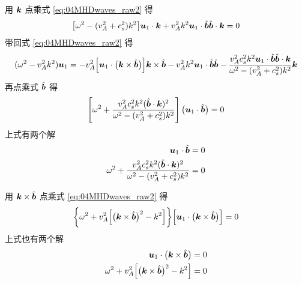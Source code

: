 用 $\bm{k}$ 点乘式 \ref{eq:04MHDwaves_raw2} 得
\begin{equation} \label{eq:04MHDwaves_k}
\big[\omega^2 - (v_A^2 + c_s^2) k^2 \big] \bm{u}_1 \cdot \bm{k}
+ v_A^2 k^2 \bm{u}_1 \cdot \hat{\bm{b}} \hat{\bm{b}} \cdot \bm{k} = 0
\end{equation}
带回式 \ref{eq:04MHDwaves_raw2} 得
\begin{equation}
(\omega^2 - v_A^2 k^2) \bm{u}_1
= - v_A^2 \Big[ \bm{u}_1 \cdot \big(\bm{k} \times \hat{\bm{b}} \big) \Big] \bm{k} \times \hat{\bm{b}}
- v_A^2 k^2 \bm{u}_1 \cdot \hat{\bm{b}} \hat{\bm{b}}
- \frac{v_A^2 c_s^2 k^2 \bm{u}_1 \cdot \hat{\bm{b}} \hat{\bm{b}} \cdot \bm{k}}{\omega^2 - (v_A^2 + c_s^2) k^2} \bm{k}
\end{equation}
再点乘式 $\hat{\bm{b}}$ 得
\begin{equation}
\left[ \omega^2 + \frac{
    v_A^2 c_s^2 k^2 (\hat{\bm{b}} \cdot \bm{k})^2
}{\omega^2 - (v_A^2 + c_s^2) k^2} \right] \big(\bm{u}_1 \cdot \hat{\bm{b}}\big) = 0
\end{equation}
上式有两个解
\begin{subequations}\begin{align}
\bm{u}_1 \cdot \hat{\bm{b}} &= 0
\label{eq:04MHDwaves_solution1}\\
\omega^2 + \frac{
    v_A^2 c_s^2 k^2 (\hat{\bm{b}} \cdot \bm{k})^2
}{\omega^2 - (v_A^2 + c_s^2) k^2} &= 0 \label{eq:04MHDwaves_solution2}
\end{align}\end{subequations}

用 $\bm{k} \times \hat{\bm{b}}$ 点乘式 \ref{eq:04MHDwaves_raw2} 得
\begin{equation}
\bigg\{\omega^2 + v_A^2 \Big[ \big(\bm{k} \times \hat{\bm{b}} \big)^2 - k^2\Big] \bigg\}
\Big[ \bm{u}_1 \cdot \big(\bm{k} \times \hat{\bm{b}} \big) \Big] = 0
\end{equation}
上式也有两个解
\begin{subequations}\begin{align}
\bm{u}_1 \cdot \big(\bm{k} \times \hat{\bm{b}} \big) &= 0
\label{eq:04MHDwaves_solution3} \\
\omega^2 + v_A^2 \Big[ \big(\bm{k} \times \hat{\bm{b}} \big)^2 - k^2\Big] &= 0
\label{eq:04MHDwaves_solution4}
\end{align}\end{subequations}

